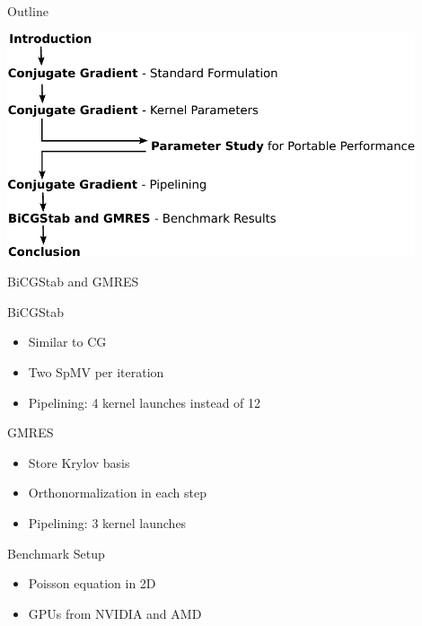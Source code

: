 

\begin{frame}{Outline}
 \begin{center}
  \includegraphics[width=0.9\textwidth]{figures/outline-crop}
 \end{center}
\end{frame}


\begin{frame}[fragile]{BiCGStab and GMRES}
 \begin{block}{BiCGStab}
 \begin{itemize}
  \item Similar to CG
  \item Two SpMV per iteration
  \item Pipelining: 4 kernel launches instead of 12
 \end{itemize}
 \end{block}   
 
 \begin{block}{GMRES}
 \begin{itemize}
  \item Store Krylov basis
  \item Orthonormalization in each step
  \item Pipelining: 3 kernel launches
 \end{itemize}
 \end{block}   

 \begin{block}{Benchmark Setup}
 \begin{itemize}
  \item Poisson equation in 2D
  \item GPUs from NVIDIA and AMD
 \end{itemize}
 \end{block}   

\end{frame}



